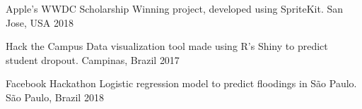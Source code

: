 \begin{cvhonors}

  \cvhonor
    {Apple's WWDC Scholarship}
    {Winning project, developed using SpriteKit.}
    {San Jose, USA}
    {2018}

  \cvhonor
    {Hack the Campus}
    {Data visualization tool made using R's Shiny to predict student dropout.}
    {Campinas, Brazil}
    {2017}

  \cvhonor
    {Facebook Hackathon}
    {Logistic regression model to predict floodings in São Paulo.}
    {São Paulo, Brazil}
    {2018}

\end{cvhonors}
